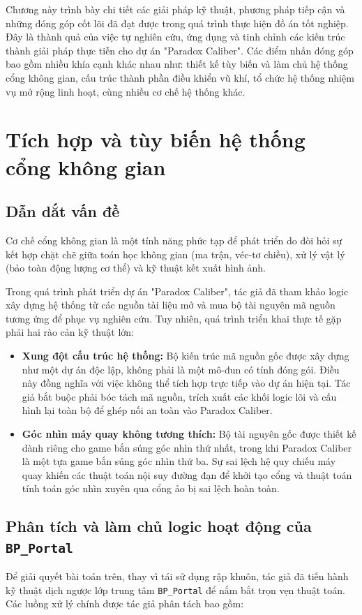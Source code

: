 \documentclass[../DoAn.tex]{subfiles}
\begin{document}
Chương này trình bày chi tiết các giải pháp kỹ thuật, phương pháp tiếp cận và những đóng góp cốt lõi đã đạt được trong quá trình thực hiện đồ án tốt nghiệp. Đây là thành quả của việc tự nghiên cứu, ứng dụng và tinh chỉnh các kiến trúc thành giải pháp thực tiễn cho dự án "Paradox Caliber". Các điểm nhấn đóng góp bao gồm nhiều khía cạnh khác nhau như: thiết kế tùy biến và làm chủ hệ thống cổng không gian, cấu trúc thành phần điều khiển vũ khí, tổ chức hệ thống nhiệm vụ mở rộng linh hoạt, cùng nhiều cơ chế hệ thống khác.

\section{Tích hợp và tùy biến hệ thống cổng không gian}

\subsection{Dẫn dắt vấn đề}
Cơ chế cổng không gian là một tính năng phức tạp để phát triển do đòi hỏi sự kết hợp chặt chẽ giữa toán học không gian (ma trận, véc-tơ chiều), xử lý vật lý (bảo toàn động lượng cơ thể) và kỹ thuật kết xuất hình ảnh. 

Trong quá trình phát triển dự án "Paradox Caliber", tác giả đã tham khảo logic xây dựng hệ thống từ các nguồn tài liệu mở và mua bộ tài nguyên mã nguồn tương ứng để phục vụ nghiên cứu. Tuy nhiên, quá trình triển khai thực tế gặp phải hai rào cản kỹ thuật lớn:
\begin{itemize}
    \item \textbf{Xung đột cấu trúc hệ thống:} Bộ kiến trúc mã nguồn gốc được xây dựng như một dự án độc lập, không phải là một mô-đun có tính đóng gói. Điều này đồng nghĩa với việc không thể tích hợp trực tiếp vào dự án hiện tại. Tác giả bắt buộc phải bóc tách mã nguồn, trích xuất các khối logic lõi và cấu hình lại toàn bộ để ghép nối an toàn vào Paradox Caliber.
    \item \textbf{Góc nhìn máy quay không tương thích:} Bộ tài nguyên gốc được thiết kế dành riêng cho game bắn súng góc nhìn thứ nhất, trong khi Paradox Caliber là một tựa game bắn súng góc nhìn thứ ba. Sự sai lệch hệ quy chiếu máy quay khiến các thuật toán nội suy đường đạn để khởi tạo cổng và thuật toán tính toán góc nhìn xuyên qua cổng ảo bị sai lệch hoàn toàn.
\end{itemize}

\subsection{Phân tích và làm chủ logic hoạt động của \texttt{BP\_Portal}}
Để giải quyết bài toán trên, thay vì tái sử dụng rập khuôn, tác giả đã tiến hành kỹ thuật dịch ngược lớp trung tâm \texttt{BP\_Portal} để nắm bắt trọn vẹn thuật toán. Các luồng xử lý chính được tác giả phân tách bao gồm:
\end{document}
